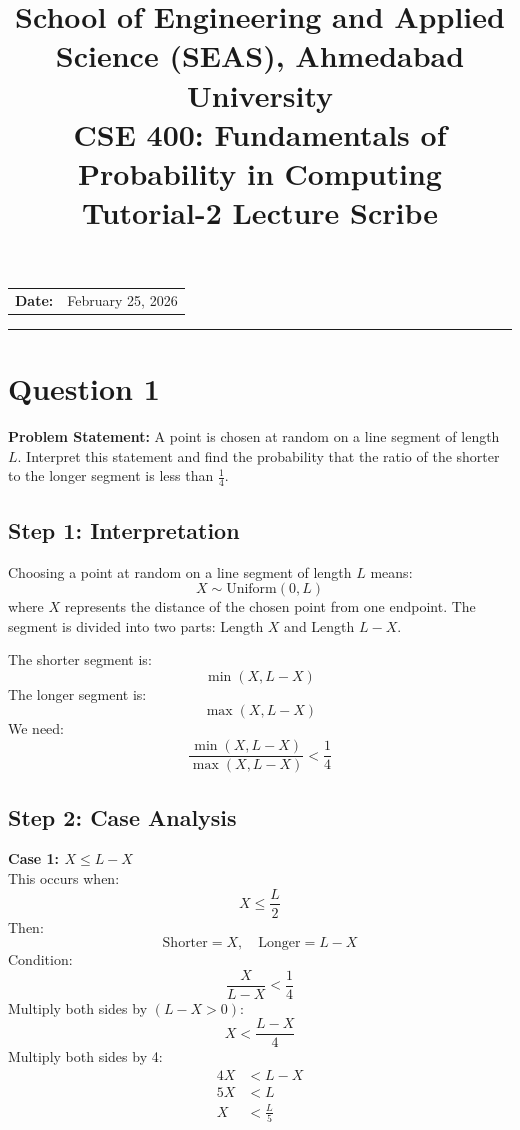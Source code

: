 \documentclass[11pt]{article}
\title{
    \normalsize School of Engineering and Applied Science (SEAS), Ahmedabad University \\
    \vspace{0.2cm}
    \textbf{CSE 400: Fundamentals of Probability in Computing}\\
    \Large Tutorial-2 Lecture Scribe
}
\author{}
\date{}
\begin{document}
\maketitle

\vspace{-1cm}
\begin{center}
    \begin{tabular}{ll}
        \textbf{Date:} & {February 25, 2026 \hspace{2.2in}} \\ [1.5ex]
        
    \end{tabular}
\end{center}

\hrule
\vspace{0.5cm}


\section*{Question 1}
\textbf{Problem Statement:} A point is chosen at random on a line segment of length $L$. Interpret this statement and find the probability that the ratio of the shorter to the longer segment is less than $\frac{1}{4}$.

\subsection*{Step 1: Interpretation}
Choosing a point at random on a line segment of length $L$ means:
\[
X \sim \text{Uniform}(0, L)
\]
where $X$ represents the distance of the chosen point from one endpoint.
The segment is divided into two parts: Length $X$ and Length $L - X$.

The shorter segment is:
\[
\min(X, L - X)
\]
The longer segment is:
\[
\max(X, L - X)
\]
We need:
\[
\frac{\min(X, L - X)}{\max(X, L - X)} < \frac{1}{4}
\]

\subsection*{Step 2: Case Analysis}
\textbf{Case 1: $X \le L - X$} \\
This occurs when:
\[
X \le \frac{L}{2}
\]
Then:
\[
\text{Shorter} = X, \quad \text{Longer} = L - X
\]
Condition:
\[
\frac{X}{L - X} < \frac{1}{4}
\]
Multiply both sides by $(L - X > 0)$:
\[
X < \frac{L - X}{4}
\]
Multiply both sides by 4:
\begin{align*}
4X &< L - X \\
5X &< L \\
X &< \frac{L}{5}
\end{align*}
\end{document}
